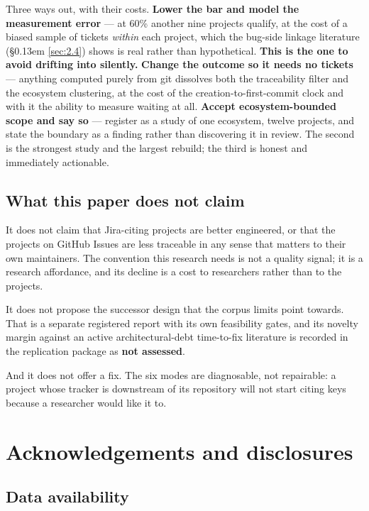 \documentclass[11pt,a4paper]{article}
\begin{document}
Three ways out, with their costs. \textbf{Lower the bar and model the measurement error} --- at 60\% another nine projects qualify, at the cost of a biased sample of tickets \emph{within} each project, which the bug-side linkage literature (\S\kern0.13em \ref{sec:2.4}) shows is real rather than hypothetical. \textbf{This is the one to avoid drifting into silently.} \textbf{Change the outcome so it needs no tickets} --- anything computed purely from git dissolves both the traceability filter and the ecosystem clustering, at the cost of the creation-to-first-commit clock and with it the ability to measure waiting at all. \textbf{Accept ecosystem-bounded scope and say so} --- register as a study of one ecosystem, twelve projects, and state the boundary as a finding rather than discovering it in review. The second is the strongest study and the largest rebuild; the third is honest and immediately actionable.

\subsection{What this paper does not claim}
\label{sec:7.5}

It does not claim that Jira-citing projects are better engineered, or that the projects on GitHub Issues are less traceable in any sense that matters to their own maintainers. The convention this research needs is not a quality signal; it is a research affordance, and its decline is a cost to researchers rather than to the projects.

It does not propose the successor design that the corpus limits point towards. That is a separate registered report with its own feasibility gates, and its novelty margin against an active architectural-debt time-to-fix literature is recorded in the replication package as \textbf{not assessed}.

And it does not offer a fix. The six modes are diagnosable, not repairable: a project whose tracker is downstream of its repository will not start citing keys because a researcher would like it to.


\section{Acknowledgements and disclosures}
\label{sec:8}

\subsection{Data availability}
\label{sec:8.1}
\end{document}
